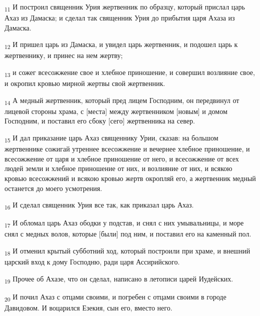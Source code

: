 \begin{tcolorbox}
\textsubscript{11} И построил священник Урия жертвенник по образцу, который прислал царь Ахаз из Дамаска; и сделал так священник Урия до прибытия царя Ахаза из Дамаска.
\end{tcolorbox}
\begin{tcolorbox}
\textsubscript{12} И пришел царь из Дамаска, и увидел царь жертвенник, и подошел царь к жертвеннику, и принес на нем жертву;
\end{tcolorbox}
\begin{tcolorbox}
\textsubscript{13} и сожег всесожжение свое и хлебное приношение, и совершил возлияние свое, и окропил кровью мирной жертвы свой жертвенник.
\end{tcolorbox}
\begin{tcolorbox}
\textsubscript{14} А медный жертвенник, который пред лицем Господним, он передвинул от лицевой стороны храма, с [места] между жертвенником [новым] и домом Господним, и поставил его сбоку [сего] жертвенника на север.
\end{tcolorbox}
\begin{tcolorbox}
\textsubscript{15} И дал приказание царь Ахаз священнику Урии, сказав: на большом жертвеннике сожигай утреннее всесожжение и вечернее хлебное приношение, и всесожжение от царя и хлебное приношение от него, и всесожжение от всех людей земли и хлебное приношение от них, и возлияние от них, и всякою кровью всесожжений и всякою кровью жертв окропляй его, а жертвенник медный останется до моего усмотрения.
\end{tcolorbox}
\begin{tcolorbox}
\textsubscript{16} И сделал священник Урия все так, как приказал царь Ахаз.
\end{tcolorbox}
\begin{tcolorbox}
\textsubscript{17} И обломал царь Ахаз ободки у подстав, и снял с них умывальницы, и море снял с медных волов, которые [были] под ним, и поставил его на каменный пол.
\end{tcolorbox}
\begin{tcolorbox}
\textsubscript{18} И отменил крытый субботний ход, который построили при храме, и внешний царский вход к дому Господню, ради царя Ассирийского.
\end{tcolorbox}
\begin{tcolorbox}
\textsubscript{19} Прочее об Ахазе, что он сделал, написано в летописи царей Иудейских.
\end{tcolorbox}
\begin{tcolorbox}
\textsubscript{20} И почил Ахаз с отцами своими, и погребен с отцами своими в городе Давидовом. И воцарился Езекия, сын его, вместо него.
\end{tcolorbox}
